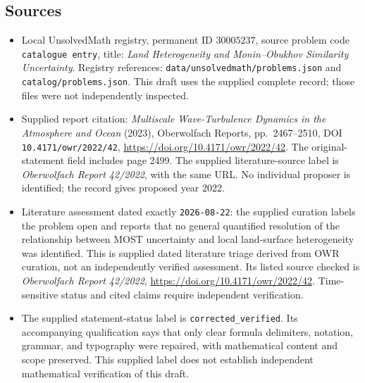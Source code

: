 \documentclass[11pt]{article}
\begin{document}
\subsection{Sources}
\begin{itemize}
\item Local UnsolvedMath registry, permanent ID \(30005237\), source problem code \texttt{catalogue entry}, title: \emph{Land Heterogeneity and Monin--Obukhov Similarity Uncertainty}. Registry references: \texttt{data/unsolvedmath/problems.json} and \texttt{catalog/problems.json}. This draft uses the supplied complete record; those files were not independently inspected.
\item Supplied report citation: \emph{Multiscale Wave-Turbulence Dynamics in the Atmosphere and Ocean} (2023), Oberwolfach Reports, pp.\ 2467--2510, DOI \texttt{10.4171/owr/2022/42}, \url{https://doi.org/10.4171/owr/2022/42}. The original-statement field includes page 2499. The supplied literature-source label is \emph{Oberwolfach Report 42/2022}, with the same URL. No individual proposer is identified; the record gives proposed year 2022.
\item Literature assessment dated exactly \texttt{2026-08-22}: the supplied curation labels the problem open and reports that no general quantified resolution of the relationship between MOST uncertainty and local land-surface heterogeneity was identified. This is supplied dated literature triage derived from OWR curation, not an independently verified assessment. Its listed source checked is \emph{Oberwolfach Report 42/2022}, \url{https://doi.org/10.4171/owr/2022/42}. Time-sensitive status and cited claims require independent verification.
\item The supplied statement-status label is \texttt{corrected\_verified}. Its accompanying qualification says that only clear formula delimiters, notation, grammar, and typography were repaired, with mathematical content and scope preserved. This supplied label does not establish independent mathematical verification of this draft.
\end{itemize}
\end{document}
